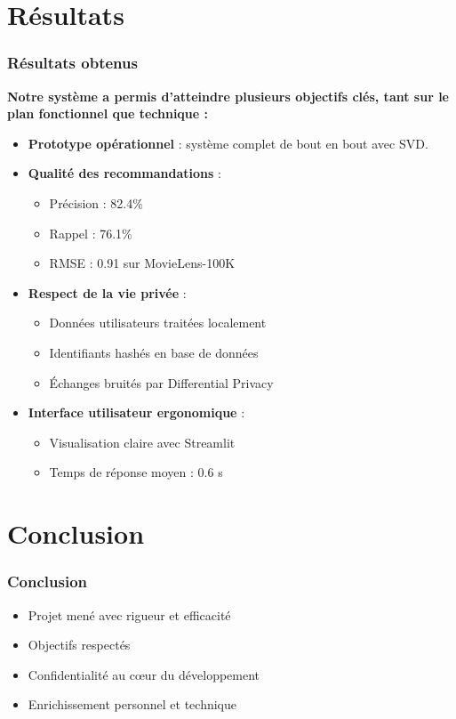\documentclass{beamer}
\begin{document}
\section{Résultats}
\begin{frame}
    \frametitle{Résultats obtenus}
    \scriptsize
    \textbf{Notre système a permis d’atteindre plusieurs objectifs clés, tant sur le plan fonctionnel que technique :}

    \vspace{0.3cm}
    \begin{itemize}
        \item \textbf{Prototype opérationnel} : système complet de bout en bout avec SVD.
        \item \textbf{Qualité des recommandations} :
        \begin{itemize}
            \item Précision : 82.4\%
            \item Rappel : 76.1\%
            \item RMSE : 0.91 sur MovieLens-100K
        \end{itemize}
        \item \textbf{Respect de la vie privée} :
        \begin{itemize}
            \item Données utilisateurs traitées localement
            \item Identifiants hashés en base de données
            \item Échanges bruités par Differential Privacy
        \end{itemize}
        \item \textbf{Interface utilisateur ergonomique} :
        \begin{itemize}
            \item Visualisation claire avec Streamlit
            \item Temps de réponse moyen : 0.6 s
        \end{itemize}
    \end{itemize}
\end{frame}


\section{Conclusion}
\begin{frame}
    \frametitle{Conclusion}
    \begin{itemize}
        \item Projet mené avec rigueur et efficacité
        \item Objectifs respectés
        \item Confidentialité au cœur du développement
        \item Enrichissement personnel et technique
    \end{itemize}
\end{frame}
\end{document}
